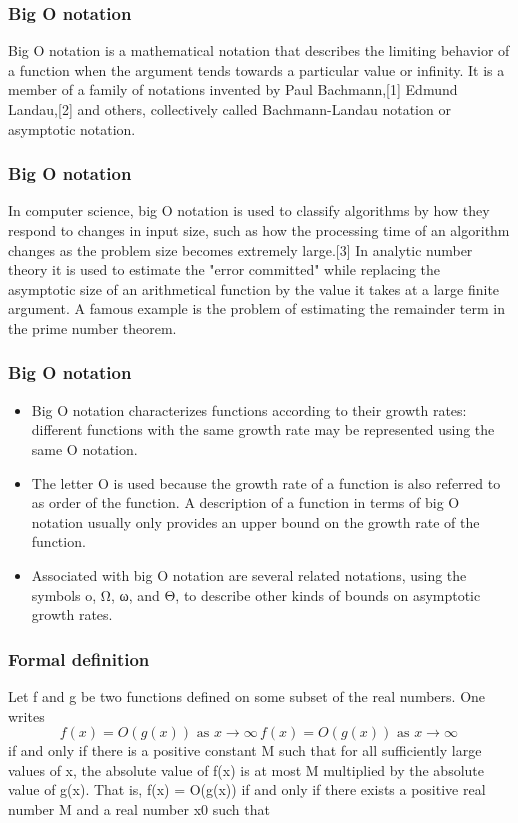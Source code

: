 \documentclass{beamer}
\begin{document}
\begin{frame}
\frametitle{Big O notation}
\large
Big O notation is a mathematical notation that describes the limiting behavior of a function when the argument tends towards a particular value or infinity. It is a member of a family of notations invented by Paul Bachmann,[1] Edmund Landau,[2] and others, collectively called Bachmann-Landau notation or asymptotic notation.
\end{frame}

\begin{frame}
\frametitle{Big O notation}
\large
In computer science, big O notation is used to classify algorithms by how they respond to changes in input size, such as how the processing time of an algorithm changes as the problem size becomes extremely large.[3] In analytic number theory it is used to estimate the "error committed" while replacing the asymptotic size of an arithmetical function by the value it takes at a large finite argument. A famous example is the problem of estimating the remainder term in the prime number theorem.
\end{frame}
\begin{frame}
\frametitle{Big O notation}
\large
\begin{itemize}
\item Big O notation characterizes functions according to their growth rates: different functions with the same growth rate may be represented using the same O notation.
\item 
The letter O is used because the growth rate of a function is also referred to as order of the function. A description of a function in terms of big O notation usually only provides an upper bound on the growth rate of the function.
\item Associated with big O notation are several related notations, using the symbols o, Ω, ω, and Θ, to describe other kinds of bounds on asymptotic growth rates.
\end{itemize}
\end{frame}
\begin{frame}
\frametitle{Formal definition}
Let f and g be two functions defined on some subset of the real numbers. One writes
\[
{\displaystyle f(x)=O(g(x)){\text{ as }}x\to \infty \,} f(x)=O(g(x)){\text{ as }}x\to \infty \,
\]
if and only if there is a positive constant M such that for all sufficiently large values of x, the absolute value of f(x) is at most M multiplied by the absolute value of g(x). That is, f(x) = O(g(x)) if and only if there exists a positive real number M and a real number x0 such that
\end{frame}
\end{document}
